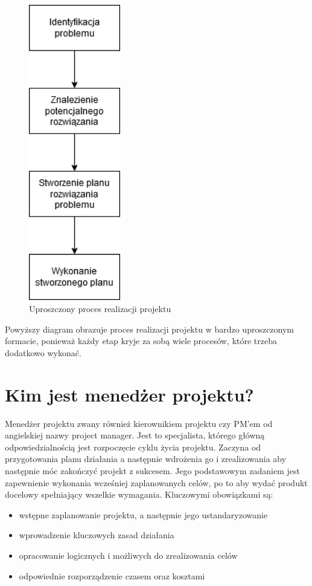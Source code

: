 \documentclass[oneside,polski,logo]{amuthesis}
\begin{document}
\begin{figure}[h]
	\centering
	\includegraphics[width=4cm]{images/hyps/diagram-zarzadzania-projektem.png}
	\caption{Uproszczony proces realizacji projektu}
\end{figure}

Powyższy diagram obrazuje proces realizacji projektu w bardzo uproszczonym formacie, ponieważ każdy etap kryje za sobą wiele procesów, które trzeba dodatkowo wykonać.\\
\section {Kim jest menedżer projektu?}
Menedżer projektu zwany również kierownikiem projektu czy PM’em od angielskiej nazwy project manager. Jest to specjalista, którego główną odpowiedzialnością jest rozpoczęcie cyklu życia projektu. Zaczyna od przygotowania planu działania a następnie wdrożenia go i zrealizowania aby następnie móc zakończyć projekt z sukcesem. Jego podstawowym zadaniem jest zapewnienie wykonania wcześniej zaplanowanych celów, po to aby wydać produkt docelowy spełniający wszelkie wymagania. Kluczowymi obowiązkami są:\\

\begin{itemize}
	\item wstępne zaplanowanie projektu, a następnie jego ustandaryzowanie
	\item wprowadzenie kluczowych zasad działania
	\item opracowanie logicznych i możliwych do zrealizowania celów
	\item odpowiednie rozporządzenie czasem oraz kosztami \\
\end{itemize}
\end{document}
